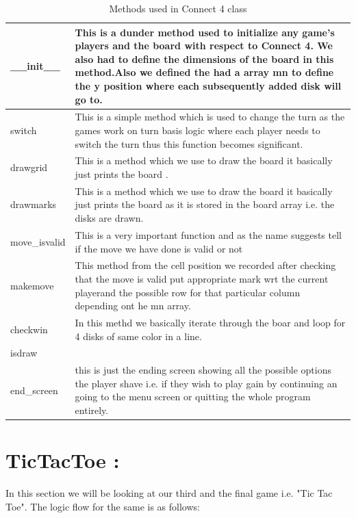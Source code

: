 \documentclass{article}
\begin{document}
\begin{itemize}[leftmargin=1.5em, topsep=0pt, itemsep=0pt]
\begin{itemize}[leftmargin=1.5em, topsep=0pt, itemsep=0pt]
\begin{table}[H]
\begin{tabular}{|p{4cm}|p{9cm}|}
\_\_init\_\_
&
This is a dunder method used to initialize any game's players and the board with respect to Connect 4. We also had to define the dimensions of the board in this method.Also we defined the had a array mn to define the y position where each subsequently added disk will go to.\\

\hline
switch 

 & This is a simple method which is used to change the turn as the games work on turn basis logic where each player needs to switch the turn thus this function becomes significant.\\
 \hline
drawgrid

 & This is a method which we use to draw the board it basically just prints the board .\\
\hline
drawmarks

 & This is a method which we use to draw the board it basically just prints the board as it is stored in the board array i.e. the disks are drawn.\\
\hline

move\_isvalid
 & This is a very important function and as the name suggests tell if the move we have done is valid or not \\
\hline
makemove
 & This method from the cell position we recorded after checking that the move is valid put appropriate mark wrt the current playerand the possible row for that particular column depending ont he mn array.\\
\hline

checkwin
 & In this methd we basically iterate through the boar and loop for 4 disks of same color in a line.\\
\hline
isdraw
 &\\
\hline
end\_screen
 & this is just the ending screen showing all the possible options the player shave i.e. if they wish to play gain by continuing an going to the menu screen or quitting the whole program entirely.\\
\hline
\end{tabular}
\caption{Methods used in Connect 4 class}
\end{table}

\newpage
\section*{TicTacToe :}
In this section we will be looking at our third and the final game i.e. "Tic Tac Toe". The logic flow for the same is as follows:\\


\end{itemize}
\end{itemize}
\end{document}
